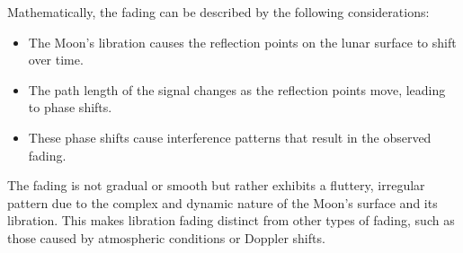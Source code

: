 Mathematically, the fading can be described by the following considerations:
\begin{itemize}
    \item The Moon's libration causes the reflection points on the lunar surface to shift over time.
    \item The path length of the signal changes as the reflection points move, leading to phase shifts.
    \item These phase shifts cause interference patterns that result in the observed fading.
\end{itemize}

The fading is not gradual or smooth but rather exhibits a fluttery, irregular pattern due to the complex and dynamic nature of the Moon's surface and its libration. This makes libration fading distinct from other types of fading, such as those caused by atmospheric conditions or Doppler shifts.

